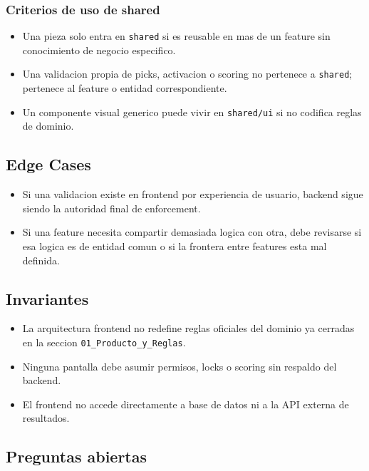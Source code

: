 \subsubsection{Criterios de uso de shared}

\begin{itemize}
  \item Una pieza solo entra en \texttt{shared} si es reusable en mas de un feature sin conocimiento de negocio especifico.
  \item Una validacion propia de picks, activacion o scoring no pertenece a \texttt{shared}; pertenece al feature o entidad correspondiente.
  \item Un componente visual generico puede vivir en \texttt{shared/ui} si no codifica reglas de dominio.
\end{itemize}

\subsection{Edge Cases}

\begin{itemize}
  \item Si una validacion existe en frontend por experiencia de usuario, backend sigue siendo la autoridad final de enforcement.
  \item Si una feature necesita compartir demasiada logica con otra, debe revisarse si esa logica es de entidad comun o si la frontera entre features esta mal definida.
\end{itemize}

\subsection{Invariantes}

\begin{itemize}
  \item La arquitectura frontend no redefine reglas oficiales del dominio ya cerradas en la seccion \texttt{01\_Producto\_y\_Reglas}.
  \item Ninguna pantalla debe asumir permisos, locks o scoring sin respaldo del backend.
  \item El frontend no accede directamente a base de datos ni a la API externa de resultados.
\end{itemize}

\subsection{Preguntas abiertas}

